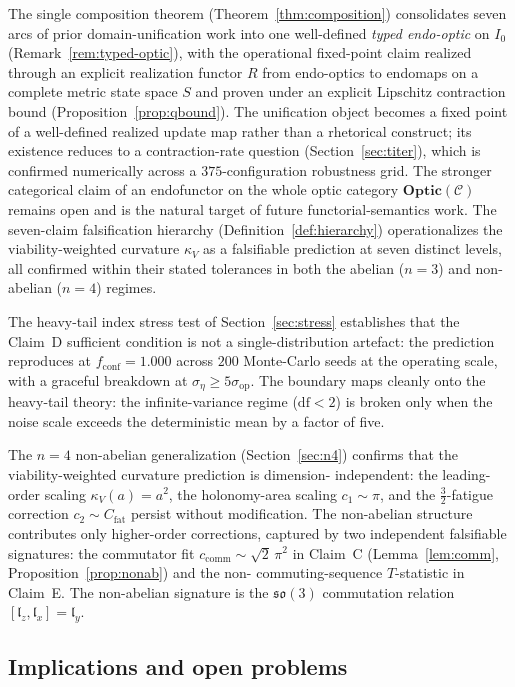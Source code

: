 \documentclass[11pt,a4paper]{article}
\theoremstyle{plain}
\theoremstyle{definition}
\theoremstyle{remark}
\newcommand{\kk}{\kappa_{\!V}}
\newcommand{\CC}{\mathcal{C}}
\newcommand{\so}{\mathfrak{so}}
\newcommand{\Optic}{\mathbf{Optic}}
\begin{document}
The single composition theorem (Theorem~\ref{thm:composition})
consolidates seven arcs of prior domain-unification work into one
well-defined \emph{typed endo-optic} on $I_0$ (Remark~\ref{rem:typed-optic}),
with the operational fixed-point claim realized through an explicit
realization functor $R$ from endo-optics to endomaps on a complete
metric state space $S$ and proven under an explicit Lipschitz
contraction bound (Proposition~\ref{prop:qbound}). The unification
object becomes a fixed point of a well-defined realized update map
rather than a rhetorical construct; its existence reduces to a
contraction-rate question (Section~\ref{sec:titer}), which is confirmed
numerically across a $375$-configuration robustness grid. The
stronger categorical claim of an endofunctor on the whole optic
category $\Optic(\CC)$ remains open and is the natural target of
future functorial-semantics work. The seven-claim falsification
hierarchy (Definition~\ref{def:hierarchy}) operationalizes the
viability-weighted curvature $\kk$ as a falsifiable prediction at seven
distinct levels, all confirmed within their stated tolerances in both
the abelian ($n=3$) and non-abelian ($n=4$) regimes.

The heavy-tail index stress test of Section~\ref{sec:stress} establishes
that the Claim~D sufficient condition is not a single-distribution
artefact: the prediction reproduces at $f_{\mathrm{conf}}=1.000$ across
$200$ Monte-Carlo seeds at the operating scale, with a graceful
breakdown at $\sigma_\eta\geq 5\sigma_{\mathrm{op}}$. The boundary maps
cleanly onto the heavy-tail theory: the infinite-variance regime
($\mathrm{df}<2$) is broken only when the noise scale exceeds the
deterministic mean by a factor of five.

The $n=4$ non-abelian generalization (Section~\ref{sec:n4}) confirms
that the viability-weighted curvature prediction is dimension-
independent: the leading-order scaling $\kk(a) = a^2$, the holonomy-area
scaling $c_1\sim\pi$, and the $\frac{3}{2}$-fatigue correction $c_2\sim
C_{\mathrm{fat}}$ persist without modification. The non-abelian
structure contributes only higher-order corrections, captured by two
independent falsifiable signatures: the commutator fit
$c_{\mathrm{comm}}\sim\sqrt{2}\,\pi^2$ in Claim~C
(Lemma~\ref{lem:comm}, Proposition~\ref{prop:nonab}) and the non-
commuting-sequence $T$-statistic in Claim~E. The non-abelian signature
is the $\so(3)$ commutation relation $[\mathfrak{l}_z,\mathfrak{l}_x]
= \mathfrak{l}_y$.

\subsection{Implications and open problems}
\end{document}
